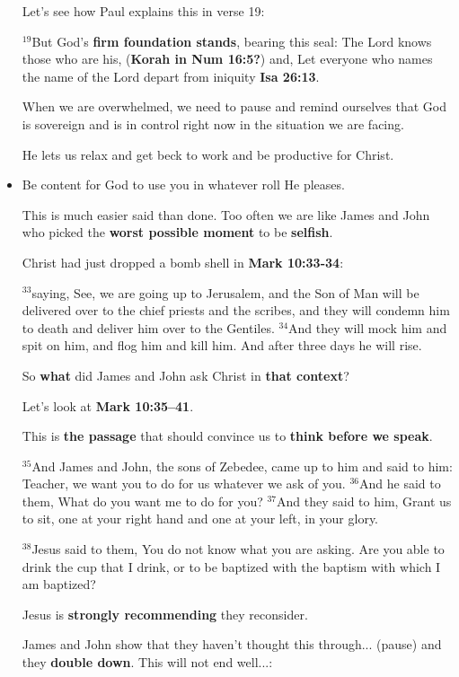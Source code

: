 \documentclass[12pt]{article} %
\newcommand{\superscript}[1]{\ensuremath{^{\textrm{#1}}}}
\begin{document}
\begin{itemize}
Let's see how Paul explains this in verse 19:
  
\superscript{19}But God’s \textbf{firm foundation stands}, bearing this seal:
The Lord knows those who are his, (\textbf{Korah in Num 16:5?})
and, Let everyone who names the name of the Lord depart from iniquity
\textbf{Isa 26:13}.

When we are overwhelmed, we need to pause and remind ourselves that God is
sovereign and is in control right now in the situation we are facing. 
  
He lets us relax and get beck to work and be productive for Christ.

\item Be content for God to use you in whatever roll He pleases.

This is much easier said than done. Too often we are like James and
John who picked the \textbf{worst possible moment} to be \textbf{selfish}.

Christ had just dropped a bomb shell in \textbf{Mark 10:33-34}:

\superscript{33}saying, See, we are going up to Jerusalem, and the Son of
Man will be delivered over to the chief priests and the scribes, and they
will condemn him to death and deliver him over to the Gentiles.
\superscript{34}And they will mock him and spit on him, and flog him and
kill him. And after three days he will rise.

So \textbf{what} did James and John ask Christ in \textbf{that context}?

Let's look at \textbf{Mark 10:35–41}.

This is \textbf{the passage} that should convince us to
\textbf{think before we speak}.

\superscript{35}And James and John, the sons of Zebedee, came up to him and
said to him:    
Teacher, we want you to do for us whatever we ask of you.
\superscript{36}And he said to them, What do you want me to do for you?
\superscript{37}And they said to him, Grant us to sit, one at your right hand
and one at your left, in your glory.

\superscript{38}Jesus said to them, You do not know what you are asking.
Are you able to drink the cup that I drink, or to be baptized with the baptism
with which I am baptized?

Jesus is \textbf{strongly recommending} they reconsider.

James and John show that they haven't thought this through... (pause)    
and they \textbf{double down}. This will not end well...:


\end{itemize}
\end{document}
